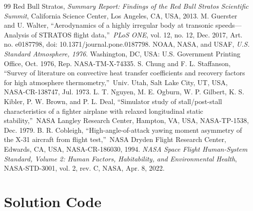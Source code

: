 \documentclass[12pt,a4paper]{article}
\numberwithin{equation}{section}
\begin{document}
\clearpage
{\small{}
\begin{thebibliography}{99}
 Red Bull Stratos, \emph{Summary Report: Findings of the Red Bull Stratos Scientific Summit}, California Science Center, Los Angeles, CA, USA, 2013.
 M. Guerster and U. Walter, ``Aerodynamics of a highly irregular body at transonic speeds---Analysis of STRATOS flight data,\textquotedblright\ \emph{PLoS ONE}, vol. 12, no. 12, Dec. 2017, Art. no. e0187798, doi: 10.1371/journal.pone.0187798.
 NOAA, NASA, and USAF, \emph{U.S. Standard Atmosphere, 1976}. Washington, DC, USA: U.S. Government Printing Office, Oct. 1976, Rep. NASA-TM-X-74335.
 S. Chung and F. L. Staffanson, ``Survey of literature on convective heat transfer coefficients and recovery factors for high atmosphere thermometry,\textquotedblright\ Univ. Utah, Salt Lake City, UT, USA, NASA-CR-138747, Jul. 1973.
 L. T. Nguyen, M. E. Ogburn, W. P. Gilbert, K. S. Kibler, P. W. Brown, and P. L. Deal, ``Simulator study of stall/post-stall characteristics of a fighter airplane with relaxed longitudinal static stability,\textquotedblright\ NASA Langley Research Center, Hampton, VA, USA, NASA-TP-1538, Dec. 1979.
 B. R. Cobleigh, ``High-angle-of-attack yawing moment asymmetry of the X-31 aircraft from flight test,\textquotedblright\ NASA Dryden Flight Research Center, Edwards, CA, USA, NASA-CR-186030, 1994.
 \emph{NASA Space Flight Human-System Standard, Volume 2: Human Factors, Habitability, and Environmental Health}, NASA-STD-3001, vol. 2, rev. C, NASA, Apr. 8, 2022.
\end{thebibliography}}

\clearpage
\appendix
\section{Solution Code}\label{app:code}

\begingroup{}
\endgroup
\end{document}
